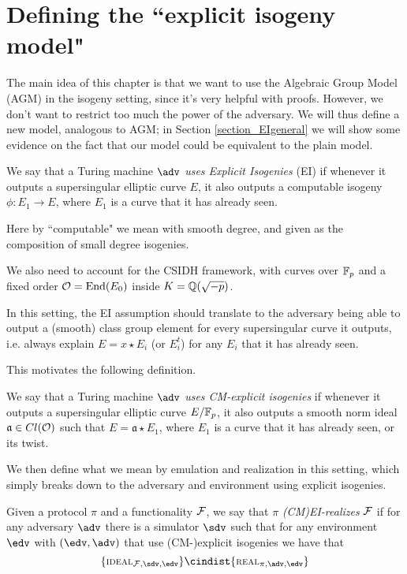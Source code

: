\section{Defining the ``explicit isogeny model"}
The main idea of this chapter is that we want to use the Algebraic Group Model (AGM) in the isogeny setting, since it's very helpful with proofs. However, we don't want to restrict too much the power of the adversary. We will thus define a new model, analogous to AGM; in Section \ref{section_EIgeneral} we will show some evidence on the fact that our model could be equivalent to the plain model.

\begin{definition}
    We say that a Turing machine $\adv$ \emph{uses Explicit Isogenies} (EI) if whenever it outputs a supersingular elliptic curve $E$, it also outputs a computable isogeny $\phi:E_1\to E$, where $E_1$ is a curve that it has already seen.
\end{definition}

Here by ``computable" we mean with smooth degree, and given as the composition of small degree isogenies.

We also need to account for the CSIDH framework, with curves over $\mathbb{F}_p$ and a fixed order $\mathcal{O}=\operatorname{End}(E_0)$ inside $K=\mathbb{Q}(\sqrt{-p})$.

In this setting, the EI assumption should translate to the adversary being able to output a (smooth) class group element for every supersingular curve it outputs, i.e. always explain $E=x\star E_i$ (or $E_i^t$) for any $E_i$ that it has already seen.

This motivates the following definition.

\begin{definition}
    We say that a Turing machine $\adv$ \emph{uses CM-explicit isogenies} if whenever it outputs a supersingular elliptic curve $E/\mathbb{F}_p$, it also outputs a smooth norm ideal $\mathfrak a\in Cl(\mathcal{O})$ such that $E=\mathfrak a\star E_1$, where $E_1$ is a curve that it has already seen, or its twist.
\end{definition}

We then define what we mean by emulation and realization in this setting, which simply breaks down to the adversary and environment using explicit isogenies.

\begin{definition}
        Given a protocol $\pi$ and a functionality $\mathcal{F}$, we say that $\pi$ \emph{(CM)EI-realizes} $\mathcal{F}$ if for any adversary $\adv$ there is a simulator $\sdv$ such that for any environment $\edv$ with $(\edv,\adv)$ that use (CM-)explicit isogenies we have that
    $$\{\textsc{\scriptsize IDEAL}_{\Fun,\sdv,\edv} \} \cindist \{\textsc{\scriptsize REAL}_{\pi,\adv,\edv} \}$$
\end{definition}


